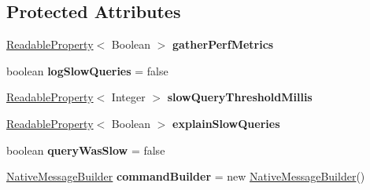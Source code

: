 \subsection*{Protected Attributes}
\begin{DoxyCompactItemize}
\item 
\mbox{\label{classcom_1_1mysql_1_1cj_1_1_server_prepared_query_a9e268a4826073f56542957cb6f2c749d}} 
\mbox{\hyperlink{interfacecom_1_1mysql_1_1cj_1_1conf_1_1_readable_property}{Readable\+Property}}$<$ Boolean $>$ {\bfseries gather\+Perf\+Metrics}
\item 
\mbox{\label{classcom_1_1mysql_1_1cj_1_1_server_prepared_query_adf3ea011f33511e148ee0849fc83422c}} 
boolean {\bfseries log\+Slow\+Queries} = false
\item 
\mbox{\label{classcom_1_1mysql_1_1cj_1_1_server_prepared_query_ac2943f0cbf8a0e6cb647c80cdbba9646}} 
\mbox{\hyperlink{interfacecom_1_1mysql_1_1cj_1_1conf_1_1_readable_property}{Readable\+Property}}$<$ Integer $>$ {\bfseries slow\+Query\+Threshold\+Millis}
\item 
\mbox{\label{classcom_1_1mysql_1_1cj_1_1_server_prepared_query_a1eab4c499551a778cb12d0c473c8b815}} 
\mbox{\hyperlink{interfacecom_1_1mysql_1_1cj_1_1conf_1_1_readable_property}{Readable\+Property}}$<$ Boolean $>$ {\bfseries explain\+Slow\+Queries}
\item 
\mbox{\label{classcom_1_1mysql_1_1cj_1_1_server_prepared_query_a2c9acc7f07f7d96a7620dc19e6dff0e9}} 
boolean {\bfseries query\+Was\+Slow} = false
\item 
\mbox{\label{classcom_1_1mysql_1_1cj_1_1_server_prepared_query_adc296978c2cf7abe01b5df5708006dcc}} 
\mbox{\hyperlink{classcom_1_1mysql_1_1cj_1_1protocol_1_1a_1_1_native_message_builder}{Native\+Message\+Builder}} {\bfseries command\+Builder} = new \mbox{\hyperlink{classcom_1_1mysql_1_1cj_1_1protocol_1_1a_1_1_native_message_builder}{Native\+Message\+Builder}}()
\end{DoxyCompactItemize}


